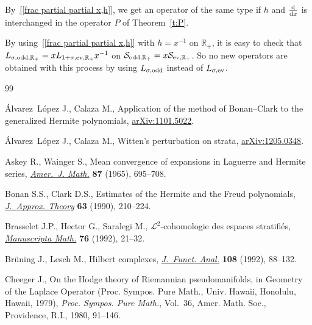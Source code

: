 \documentclass[11pt]{article}
\newcommand{\R}{\mathbb{R}}
\renewcommand{\SS}{\mathcal{S}}
\begin{document}
\begin{Remark}\label{r:Q}
  By~\eqref{[frac partial partial x,h]}, we get an operator of the same type if $h$ and $\frac{{\rm d}}{{\rm d}x}$ is interchanged in the operator $P$ of Theorem~\ref{t:P}.
\end{Remark}

\begin{Remark}
By using~\eqref{[frac partial partial x,h]} with $h=x^{-1}$ on $\R_+$, it is easy to check that $L_{\sigma,\text{\rm odd},\R_+}=xL_{1+\sigma,\text{\rm ev},\R_+}x^{-1}$ on $\SS_{\text{\rm odd},\R_+}=x \SS_{\text{\rm ev},\R_+}$. So no new operators are obtained with this process by using $L_{\sigma,\text{\rm odd}}$ instead of $L_{\sigma,\text{\rm ev}}$.
\end{Remark}

\begin{thebibliography}{99}
\footnotesize\itemsep=0pt

\'Alvarez~L\'opez J., Calaza M., Application of the method of Bonan--Clark to
  the generalized Hermite polynomials, \href{http://arxiv.org/abs/1101.5022}{arXiv:1101.5022}.

\'Alvarez~L\'opez J., Calaza M., Witten's perturbation on strata,
  \href{http://arxiv.org/abs/1205.0348}{arXiv:1205.0348}.

Askey R., Wainger S., Mean convergence of expansions in {L}aguerre and
  {H}ermite series, \href{http://dx.doi.org/10.2307/2373069}{\textit{Amer.~J. Math.}} \textbf{87} (1965), 695--708.

Bonan S.S., Clark D.S., Estimates of the {H}ermite and the {F}reud polynomials,
  \href{http://dx.doi.org/10.1016/0021-9045(90)90104-X}{\textit{J.~Approx. Theory}} \textbf{63} (1990), 210--224.

Brasselet J.P., Hector G., Saralegi M., {${\mathcal L}^2$}-cohomologie des
  espaces stratif\/i\'es, \href{http://dx.doi.org/10.1007/BF02567744}{\textit{Manuscripta Math.}} \textbf{76} (1992), 21--32.

Br{\"u}ning J., Lesch M., Hilbert complexes, \href{http://dx.doi.org/10.1016/0022-1236(92)90147-B}{\textit{J.~Funct. Anal.}}
  \textbf{108} (1992), 88--132.

Cheeger J., On the {H}odge theory of {R}iemannian pseudomanifolds, in Geometry
  of the {L}aplace Operator ({P}roc. {S}ympos. {P}ure {M}ath., {U}niv.
  {H}awaii, {H}onolulu, {H}awaii, 1979), \textit{Proc. Sympos. Pure Math.},
  Vol.~36, Amer. Math. Soc., Providence, R.I., 1980, 91--146.


\end{thebibliography}
\end{document}
